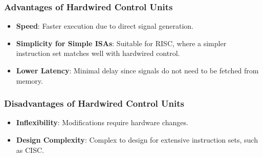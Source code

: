 \begin{frame}
    \frametitle{Advantages of Hardwired Control Units}
    \begin{itemize}
        \item \textbf{Speed}: Faster execution due to direct signal generation.
        \item \textbf{Simplicity for Simple ISAs}: Suitable for RISC, where a simpler instruction set matches well with hardwired control.
        \item \textbf{Lower Latency}: Minimal delay since signals do not need to be fetched from memory.
    \end{itemize}
\end{frame}


\begin{frame}
    \frametitle{Disadvantages of Hardwired Control Units}
    \begin{itemize}
        \item \textbf{Inflexibility}: Modifications require hardware changes.
        \item \textbf{Design Complexity}: Complex to design for extensive instruction sets,
        such as CISC.
    \end{itemize}
\end{frame}


